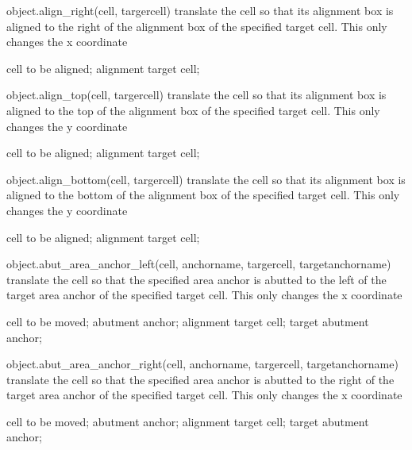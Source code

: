 \begin{APIfunc}{object.align\_right(cell, targercell)}
    translate the cell so that its alignment box is aligned to the right of the alignment box of the specified target cell. This only changes the x coordinate
    \begin{APIparameters}
            cell to be aligned;
            alignment target cell;
    \end{APIparameters}
\end{APIfunc}
\begin{APIfunc}{object.align\_top(cell, targercell)}
    translate the cell so that its alignment box is aligned to the top of the alignment box of the specified target cell. This only changes the y coordinate
    \begin{APIparameters}
            cell to be aligned;
            alignment target cell;
    \end{APIparameters}
\end{APIfunc}
\begin{APIfunc}{object.align\_bottom(cell, targercell)}
    translate the cell so that its alignment box is aligned to the bottom of the alignment box of the specified target cell. This only changes the y coordinate
    \begin{APIparameters}
            cell to be aligned;
            alignment target cell;
    \end{APIparameters}
\end{APIfunc}
\begin{APIfunc}{object.abut\_area\_anchor\_left(cell, anchorname, targercell, targetanchorname)}
    translate the cell so that the specified area anchor is abutted to the left of the target area anchor of the specified target cell. This only changes the x coordinate
    \begin{APIparameters}
            cell to be moved;
            abutment anchor;
            alignment target cell;
            target abutment anchor;
    \end{APIparameters}
\end{APIfunc}
\begin{APIfunc}{object.abut\_area\_anchor\_right(cell, anchorname, targercell, targetanchorname)}
    translate the cell so that the specified area anchor is abutted to the right of the target area anchor of the specified target cell. This only changes the x coordinate
    \begin{APIparameters}
            cell to be moved;
            abutment anchor;
            alignment target cell;
            target abutment anchor;
    \end{APIparameters}
\end{APIfunc}
